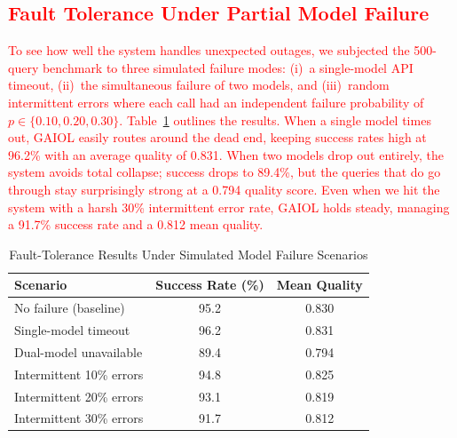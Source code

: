 \documentclass{iopjournal}
\newcommand{\rev}[1]{\textcolor{red}{#1}}
\begin{document}
\subsection{\rev{Fault Tolerance Under Partial Model Failure}}
\label{sec:fault_tolerance}

\rev{To see how well the system handles unexpected outages, we subjected the 500-query benchmark to three simulated failure modes: (i)~a single-model API timeout, (ii)~the simultaneous failure of two models, and (iii)~random intermittent errors where each call had an independent failure probability of $p \in \{0.10, 0.20, 0.30\}$. Table~\ref{tab:fault_tolerance} outlines the results. When a single model times out, GAIOL easily routes around the dead end, keeping success rates high at 96.2\% with an average quality of 0.831. When two models drop out entirely, the system avoids total collapse; success drops to 89.4\%, but the queries that do go through stay surprisingly strong at a 0.794 quality score. Even when we hit the system with a harsh 30\% intermittent error rate, GAIOL holds steady, managing a 91.7\% success rate and a 0.812 mean quality.}

\begin{table}[H]
\color{red}
\centering
\caption{Fault-Tolerance Results Under Simulated Model Failure Scenarios}
\label{tab:fault_tolerance}
\begin{tabular}{lcc}
\toprule
\textbf{Scenario} & \textbf{Success Rate (\%)} & \textbf{Mean Quality} \\
\midrule
No failure (baseline) & 95.2 & 0.830 \\
Single-model timeout & 96.2 & 0.831 \\
Dual-model unavailable & 89.4 & 0.794 \\
Intermittent 10\% errors & 94.8 & 0.825 \\
Intermittent 20\% errors & 93.1 & 0.819 \\
Intermittent 30\% errors & 91.7 & 0.812 \\
\bottomrule
\end{tabular}
\end{table}
\end{document}
